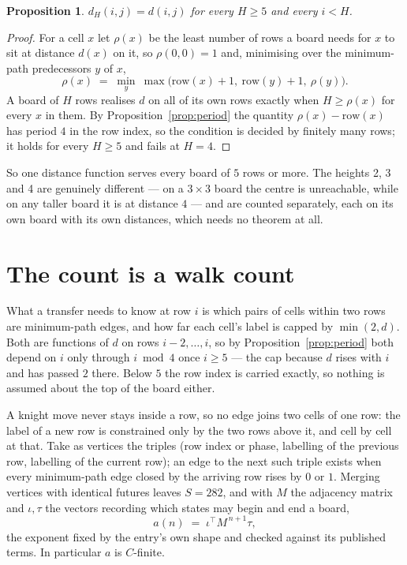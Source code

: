 \documentclass[11pt,a4paper]{article}
\theoremstyle{plain}
\newtheorem{proposition}[theorem]{Proposition}
\theoremstyle{definition}
\begin{document}
\begin{proposition}\label{prop:height}
$d_H(i,j)=d(i,j)$ for every $H\ge5$ and every $i<H$.
\end{proposition}

\begin{proof}
For a cell $x$ let $\rho(x)$ be the least number of rows a board needs for $x$ to sit at distance $d(x)$ on it, so $\rho(0,0)=1$ and, minimising over the minimum-path predecessors $y$ of $x$,
\[ \rho(x)\;=\;\min_y\ \max\bigl(\mathrm{row}(x)+1,\ \mathrm{row}(y)+1,\ \rho(y)\bigr). \]
A board of $H$ rows realises $d$ on all of its own rows exactly when $H\ge\rho(x)$ for every $x$ in them. By Proposition~\ref{prop:period} the quantity $\rho(x)-\mathrm{row}(x)$ has period $4$ in the row index, so the condition is decided by finitely many rows; it holds for every $H\ge5$ and fails at $H=4$.
\end{proof}

So one distance function serves every board of $5$ rows or more. The heights 2, 3 and 4 are genuinely different --- on a $3\times3$ board the centre is unreachable, while on any taller board it is at distance $4$ --- and are counted separately, each on its own board with its own distances, which needs no theorem at all.

\section{The count is a walk count}

What a transfer needs to know at row $i$ is which pairs of cells within two rows are minimum-path edges, and how far each cell's label is capped by $\min(2,d)$. Both are functions of $d$ on rows $i-2,\dots,i$, so by Proposition~\ref{prop:period} both depend on $i$ only through $i\bmod 4$ once $i\ge5$ --- the cap because $d$ rises with $i$ and has passed $2$ there. Below $5$ the row index is carried exactly, so nothing is assumed about the top of the board either.

A knight move never stays inside a row, so no edge joins two cells of one row: the label of a new row is constrained only by the two rows above it, and cell by cell at that. Take as vertices the triples (row index or phase, labelling of the previous row, labelling of the current row); an edge to the next such triple exists when every minimum-path edge closed by the arriving row rises by $0$ or $1$. Merging vertices with identical futures leaves $S=282$, and with $M$ the adjacency matrix and $\iota,\tau$ the vectors recording which states may begin and end a board,
\[
a(n)\;=\;\iota^{\!\top}M^{\,n+1}\tau ,
\]
the exponent fixed by the entry's own shape and checked against its published terms. In
particular $a$ is $C$-finite.
\end{document}
